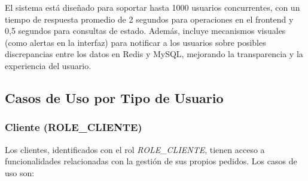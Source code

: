 \documentclass[a4paper,12pt]{article}
\begin{document}
El sistema está diseñado para soportar hasta 1000 usuarios concurrentes, con un tiempo de respuesta promedio de 2 segundos para operaciones en el frontend y 0,5 segundos para consultas de estado. Además, incluye mecanismos visuales (como alertas en la interfaz) para notificar a los usuarios sobre posibles discrepancias entre los datos en Redis y MySQL, mejorando la transparencia y la experiencia del usuario.

\subsection{Casos de Uso por Tipo de Usuario}

\subsubsection{Cliente (ROLE\_CLIENTE)}
Los clientes, identificados con el rol \textit{ROLE\_CLIENTE}, tienen acceso a funcionalidades relacionadas con la gestión de sus propios pedidos. Los casos de uso son:
\end{document}
